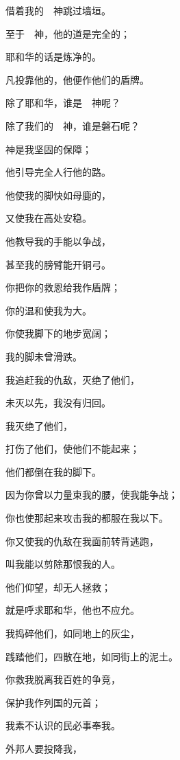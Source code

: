 {\par }{\Q 借着我的　神跳过墙垣。
\par }{\Q {}至于　神，他的道是完全的；
\par }{\Q 耶和华的话是炼净的。
\par }{\Q 凡投靠他的，他便作他们的盾牌。
\par }{\BB \par }{\Q {}除了耶和华，谁是　神呢？
\par }{\Q 除了我们的　神，谁是磐石呢？
\par }{\Q {}神是我坚固的保障；
\par }{\Q 他引导完全人行他的路。
\par }{\Q {}他使我的脚快如母鹿的{}，
\par }{\Q 又使我在高处安稳。
\par }{\Q {}他教导我的手能以争战，
\par }{\Q 甚至我的膀臂能开铜弓。
\par }{\Q {}你把你的救恩给我作盾牌；
\par }{\Q 你的温和使我为大。
\par }{\Q {}你使我脚下的地步宽阔；
\par }{\Q 我的脚未曾滑跌。
\par }{\Q {}我追赶我的仇敌，灭绝了他们，
\par }{\Q 未灭以先，我没有归回。
\par }{\Q {}我灭绝了他们，
\par }{\Q 打伤了他们，使他们不能起来；
\par }{\Q 他们都倒在我的脚下。
\par }{\Q {}因为你曾以力量束我的腰，使我能争战；
\par }{\Q 你也使那起来攻击我的都服在我以下。
\par }{\Q {}你又使我的仇敌在我面前转背逃跑，
\par }{\Q 叫我能以剪除那恨我的人。
\par }{\Q {}他们仰望，却无人拯救；
\par }{\Q 就是呼求耶和华，他也不应允。
\par }{\Q {}我捣碎他们，如同地上的灰尘，
\par }{\Q 践踏他们，四散在地，如同街上的泥土。
\par }{\Q {}你救我脱离我百姓的争竞，
\par }{\Q 保护我作列国的元首；
\par }{\Q 我素不认识的民必事奉我。
\par }{\Q {}外邦人要投降我，
}
